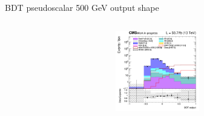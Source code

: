 \documentclass[8pt]{beamer}
\begin{document}
\begin{frame}{BDT pseudoscalar 500 GeV output shape}
\begin{columns}
\begin{column}{0.33\textwidth}
\begin{center}
     			\includegraphics[width=1.0\textwidth, height=100pt]{figs/2018/SmearSR-ttDM-pseudo500/log_cratio_TTbar_topCR_ll_BDT_ttDM500_TTbar_BDT_output_pseudoscalar500_customBinsAttempt7.png}
    		\end{center}		
		\end{column}
\end{columns} \vfill
\end{frame}
\end{document}
